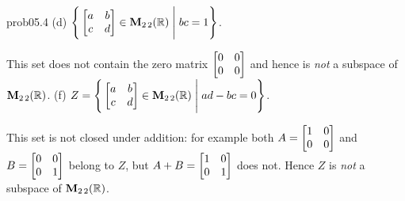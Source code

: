 \begin{sol}{prob05.4}
(d)  $\Bigg\{  \bmatrix a&b\\ c&d\endbmatrix \in \M_{2 \,2}(\R) \;\Bigg|\; bc=1\Bigg\}$. 

\soln This set does not contain the zero matrix  $\bmatrix 0&0\\ 0&0\endbmatrix$ and hence is {\it not} a subspace of $\mathbf{M}_{2 \,2}(\mathbb{R})$.   \medskip
%
 (f)  $Z=\Bigg\{  \bmatrix a&b\\ c&d\endbmatrix \in \M_{2 \,2}(\R) \;\Bigg|\; ad-bc=0\Bigg\}$. 

\soln This set is not closed under addition: for example both $A=\bmatrix 1&0\\ 0&0\endbmatrix$ and $B=\bmatrix 0&0\\ 0&1\endbmatrix$ belong to $Z$, but $A+B=\bmatrix 1&0\\ 0&1\endbmatrix$ does not. Hence $Z$ is {\it not} a subspace of $\mathbf{M}_{2 \,2}(\mathbb{R})$.   \medskip
%

\end{sol}

